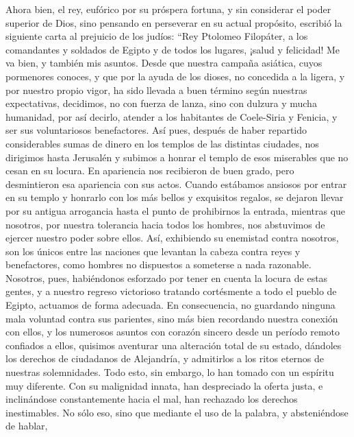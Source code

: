  Ahora bien, el rey, eufórico por su próspera fortuna, y
sin considerar el poder superior de Dios, sino pensando en perseverar en
su actual propósito, escribió la siguiente carta al prejuicio de los
judíos:  ``Rey Ptolomeo Filopáter, a los comandantes y
soldados de Egipto y de todos los lugares, ¡salud y felicidad!
 Me va bien, y también mis asuntos.  Desde
que nuestra campaña asiática, cuyos pormenores conoces, y que por la
ayuda de los dioses, no concedida a la ligera, y por nuestro propio
vigor, ha sido llevada a buen término según nuestras expectativas,
 decidimos, no con fuerza de lanza, sino con dulzura y
mucha humanidad, por así decirlo, atender a los habitantes de
Coele-Siria y Fenicia, y ser sus voluntariosos benefactores.
 Así pues, después de haber repartido considerables sumas
de dinero en los templos de las distintas ciudades, nos dirigimos hasta
Jerusalén y subimos a honrar el templo de esos miserables que no cesan
en su locura.  En apariencia nos recibieron de buen
grado, pero desmintieron esa apariencia con sus actos. Cuando estábamos
ansiosos por entrar en su templo y honrarlo con los más bellos y
exquisitos regalos,  se dejaron llevar por su antigua
arrogancia hasta el punto de prohibirnos la entrada, mientras que
nosotros, por nuestra tolerancia hacia todos los hombres, nos abstuvimos
de ejercer nuestro poder sobre ellos.  Así, exhibiendo su
enemistad contra nosotros, son los únicos entre las naciones que
levantan la cabeza contra reyes y benefactores, como hombres no
dispuestos a someterse a nada razonable.  Nosotros, pues,
habiéndonos esforzado por tener en cuenta la locura de estas gentes, y a
nuestro regreso victorioso tratando cortésmente a todo el pueblo de
Egipto, actuamos de forma adecuada.  En consecuencia, no
guardando ninguna mala voluntad contra sus parientes, sino más bien
recordando nuestra conexión con ellos, y los numerosos asuntos con
corazón sincero desde un período remoto confiados a ellos, quisimos
aventurar una alteración total de su estado, dándoles los derechos de
ciudadanos de Alejandría, y admitirlos a los ritos eternos de nuestras
solemnidades.  Todo esto, sin embargo, lo han tomado con
un espíritu muy diferente. Con su malignidad innata, han despreciado la
oferta justa, e inclinándose constantemente hacia el mal,
 han rechazado los derechos inestimables. No sólo eso,
sino que mediante el uso de la palabra, y absteniéndose de hablar,
